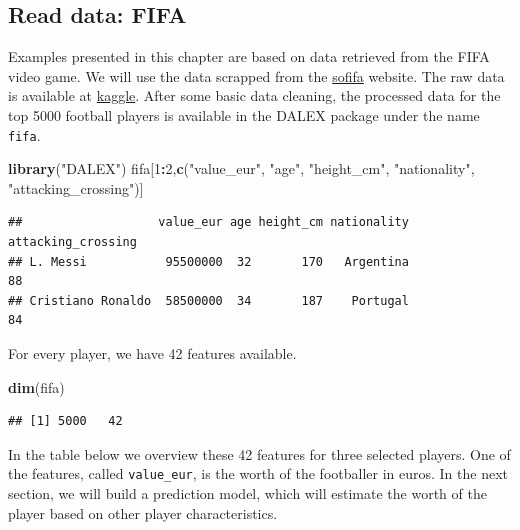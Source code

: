 \documentclass[]{scrbook}
\newenvironment{Shaded}{\begin{snugshade}}{\end{snugshade}}
\newcommand{\DecValTok}[1]{\textcolor[rgb]{0.00,0.00,0.81}{#1}}
\newcommand{\KeywordTok}[1]{\textcolor[rgb]{0.13,0.29,0.53}{\textbf{#1}}}
\newcommand{\NormalTok}[1]{#1}
\newcommand{\OperatorTok}[1]{\textcolor[rgb]{0.81,0.36,0.00}{\textbf{#1}}}
\newcommand{\StringTok}[1]{\textcolor[rgb]{0.31,0.60,0.02}{#1}}
\renewenvironment{Shaded} {\begin{snugshade}\small} {\end{snugshade}}
\begin{document}
\hypertarget{interpretability-data-fifa}{%
\subsection{Read data: FIFA}\label{interpretability-data-fifa}}

Examples presented in this chapter are based on data retrieved from the FIFA video game. We will use the data scrapped from the \href{https://sofifa.com/}{sofifa} website. The raw data is available at \href{https://www.kaggle.com/stefanoleone992/fifa-20-complete-player-dataset}{kaggle}. After some basic data cleaning, the processed data for the top 5000 football players is available in the DALEX package under the name \texttt{fifa}.

\begin{Shaded}
\begin{Highlighting}[]
\KeywordTok{library}\NormalTok{(}\StringTok{"DALEX"}\NormalTok{)}
\NormalTok{fifa[}\DecValTok{1}\OperatorTok{:}\DecValTok{2}\NormalTok{,}\KeywordTok{c}\NormalTok{(}\StringTok{"value_eur"}\NormalTok{, }\StringTok{"age"}\NormalTok{, }\StringTok{"height_cm"}\NormalTok{, }\StringTok{"nationality"}\NormalTok{, }\StringTok{"attacking_crossing"}\NormalTok{)]}
\end{Highlighting}
\end{Shaded}

\begin{verbatim}
##                   value_eur age height_cm nationality attacking_crossing
## L. Messi           95500000  32       170   Argentina                 88
## Cristiano Ronaldo  58500000  34       187    Portugal                 84
\end{verbatim}

For every player, we have 42 features available.

\begin{Shaded}
\begin{Highlighting}[]
\KeywordTok{dim}\NormalTok{(fifa)}
\end{Highlighting}
\end{Shaded}

\begin{verbatim}
## [1] 5000   42
\end{verbatim}

In the table below we overview these 42 features for three selected players.
One of the features, called \texttt{value\_eur}, is the worth of the footballer in euros. In the next section, we will build a prediction model, which will estimate the worth of the player based on other player characteristics.
\end{document}
